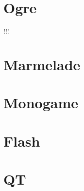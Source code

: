 \section{Ogre}
!!!
\section{Marmelade}
\section{Monogame}

\section{Flash}

\section{QT}
\label{sec:qt}

